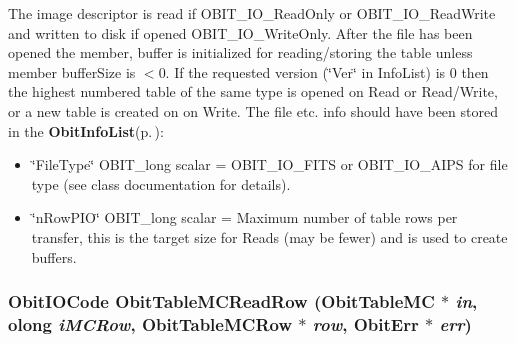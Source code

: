 The image descriptor is read if OBIT\_\-IO\_\-Read\-Only or OBIT\_\-IO\_\-Read\-Write and written to disk if opened OBIT\_\-IO\_\-Write\-Only. After the file has been opened the member, buffer is initialized for reading/storing the table unless member buffer\-Size is $<$0. If the requested version (\char`\"{}Ver\char`\"{} in Info\-List) is 0 then the highest numbered table of the same type is opened on Read or Read/Write, or a new table is created on on Write. The file etc. info should have been stored in the {\bf Obit\-Info\-List}{\rm (p.\,\pageref{structObitInfoList})}: \begin{itemize}
\item \char`\"{}File\-Type\char`\"{} OBIT\_\-long scalar = OBIT\_\-IO\_\-FITS or OBIT\_\-IO\_\-AIPS for file type (see class documentation for details). \item \char`\"{}n\-Row\-PIO\char`\"{} OBIT\_\-long scalar = Maximum number of table rows per transfer, this is the target size for Reads (may be fewer) and is used to create buffers. 
\end{itemize}
\subsubsection{\setlength{\rightskip}{0pt plus 5cm}Obit\-IOCode Obit\-Table\-MCRead\-Row ({\bf Obit\-Table\-MC} $\ast$ {\em in}, {\bf olong} {\em i\-MCRow}, {\bf Obit\-Table\-MCRow} $\ast$ {\em row}, {\bf Obit\-Err} $\ast$ {\em err})}\label{ObitTableMC_8c_a22}


